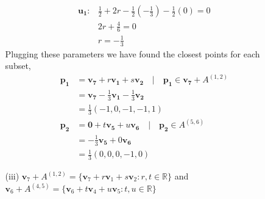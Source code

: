 \documentclass[12pt]{article}
\begin{document}
\begin{enumerate}
\begin{enumerate}
\begin{align*}
                        \mathbf{u_1}: & \tfrac{1}{2} + 2r - \tfrac{1}{2}(-\tfrac{1}{3}) - \tfrac{1}{2}(0)=0      \\
                                      & 2r + \tfrac{4}{6} = 0                                                    \\
                                      & r = -\tfrac{1}{3}
                    \end{align*}
                    Plugging these parameters we have found the closest points for each subset,
                    \begin{align*}
                        \mathbf{p_1} & = \mathbf{v_7} + r\mathbf{v_1} + s\mathbf{v_2} \quad{} | \quad{} \mathbf{p_1} \in{} \mathbf{v_7} + A^{(1,2)} \\
                                     & =\mathbf{v_7} - \tfrac{1}{3} \mathbf{v_1} - \tfrac{1}{3} \mathbf{v_2}                                        \\
                                     & = \tfrac{1}{3} (-1,0,-1,-1,1)                                                                                \\
                        \mathbf{p_2} & = \mathbf{0} + t\mathbf{v_5} + u\mathbf{v_6} \quad{} | \quad{} \mathbf{p_2} \in{} A^{(5,6)}                  \\
                                     & = - \tfrac{1}{3} \mathbf{v_5} + 0\mathbf{v_6}                                                                \\
                                     & = \tfrac{1}{3} (0,0,0,-1,0)
                    \end{align*}

              \item[(iii)] $\mathbf{v}_7 + A^{(1,2)} = \{\mathbf{v}_7 + r\mathbf{v}_1 + s\mathbf{v}_2 : r, t \in \mathbb{R}\}$ and $\mathbf{v}_6 + A^{(4,5)} = \{\mathbf{v}_6 + t\mathbf{v}_4 + u\mathbf{v}_5 : t, u \in \mathbb{R}\}$


\end{enumerate}
\end{enumerate}
\end{document}
